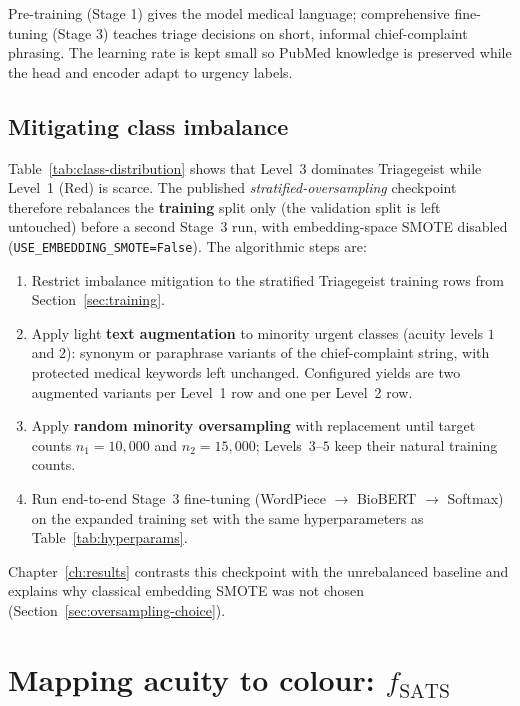 \begin{remark}
Pre-training (Stage 1) gives the model medical language; comprehensive fine-tuning (Stage 3) teaches triage decisions on short, informal chief-complaint phrasing. The learning rate is kept small so PubMed knowledge is preserved while the head and encoder adapt to urgency labels.
\end{remark}

\subsection{Mitigating class imbalance}
\label{sec:imbalance-mitigation}

Table~\ref{tab:class-distribution} shows that Level~3 dominates Triagegeist while Level~1 (Red) is scarce. The published \emph{stratified-oversampling} checkpoint therefore rebalances the \textbf{training} split only (the validation split is left untouched) before a second Stage~3 run, with embedding-space SMOTE disabled (\texttt{USE\_EMBEDDING\_SMOTE=False}). The algorithmic steps are:

\begin{enumerate}
\item Restrict imbalance mitigation to the stratified Triagegeist training rows from Section~\ref{sec:training}.
\item Apply light \textbf{text augmentation} to minority urgent classes (acuity levels \(1\) and \(2\)): synonym or paraphrase variants of the chief-complaint string, with protected medical keywords left unchanged. Configured yields are two augmented variants per Level~1 row and one per Level~2 row.
\item Apply \textbf{random minority oversampling} with replacement until target counts \(n_1 = 10{,}000\) and \(n_2 = 15{,}000\); Levels~$3$--$5$ keep their natural training counts.
\item Run end-to-end Stage~3 fine-tuning (WordPiece \(\rightarrow\) BioBERT \(\rightarrow\) Softmax) on the expanded training set with the same hyperparameters as Table~\ref{tab:hyperparams}.
\end{enumerate}

Chapter~\ref{ch:results} contrasts this checkpoint with the unrebalanced baseline and explains why classical embedding SMOTE was not chosen (Section~\ref{sec:oversampling-choice}).

\section{Mapping acuity to colour: \(f_{\mathrm{SATS}}\)}
\label{sec:fsats}

